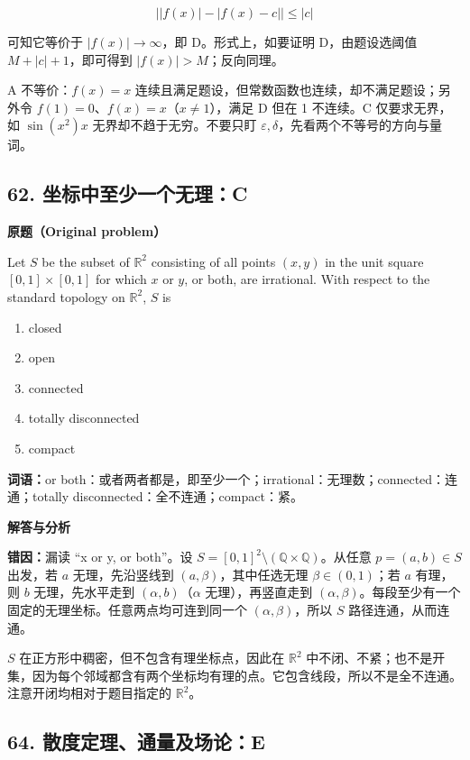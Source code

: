 \documentclass[11pt,a4paper]{ctexart}
\begin{document}
\[\bigl||f(x)|-|f(x)-c|\bigr|\le |c|\]

可知它等价于 \(|f(x)|\to\infty\)，即 D。形式上，如要证明 D，由题设选阈值
\(M+|c|+1\)，即可得到 \(|f(x)|>M\)；反向同理。

A 不等价：\(f(x)=x\)
连续且满足题设，但常数函数也连续，却不满足题设；另外令
\(f(1)=0\)、\(f(x)=x\)（\(x\ne1\)），满足 D 但在 1 不连续。C
仅要求无界，如 \(\sin(x^2)x\) 无界却不趋于无穷。不要只盯
\(\varepsilon,\delta\)，先看两个不等号的方向与量词。

\hypertarget{ux5750ux6807ux4e2dux81f3ux5c11ux4e00ux4e2aux65e0ux7406c}{%
\subsection{62.
坐标中至少一个无理：C}\label{ux5750ux6807ux4e2dux81f3ux5c11ux4e00ux4e2aux65e0ux7406c}}

\textbf{原题（Original problem）}\par
Let $S$ be the subset of $\mathbb R^2$ consisting of all points $(x,y)$ in the unit square $[0,1]\times[0,1]$ for which $x$ or $y$, or both, are irrational. With respect to the standard topology on $\mathbb R^2$, $S$ is
\begin{enumerate}[label=(\Alph*),nosep]
\item closed \item open \item connected \item totally disconnected \item compact
\end{enumerate}
\textbf{词语：}or both：或者两者都是，即至少一个；irrational：无理数；connected：连通；totally disconnected：全不连通；compact：紧。

\textbf{解答与分析}\par


\textbf{错因：}漏读 ``x or y, or both''。设
\(S=[0,1]^2\setminus(\mathbb Q\times\mathbb Q)\)。从任意
\(p=(a,b)\in S\) 出发，若 \(a\) 无理，先沿竖线到
\((a,\beta)\)，其中任选无理 \(\beta\in(0,1)\)；若 \(a\) 有理，则 \(b\)
无理，先水平走到 \((\alpha,b)\)（\(\alpha\) 无理），再竖直走到
\((\alpha,\beta)\)。每段至少有一个固定的无理坐标。任意两点均可连到同一个
\((\alpha,\beta)\)，所以 \(S\) 路径连通，从而连通。

\(S\) 在正方形中稠密，但不包含有理坐标点，因此在 \(\mathbb R^2\)
中不闭、不紧；也不是开集，因为每个邻域都含有两个坐标均有理的点。它包含线段，所以不是全不连通。注意开闭均相对于题目指定的
\(\mathbb R^2\)。

\hypertarget{ux6563ux5ea6ux5b9aux7406ux901aux91cfux53caux573aux8bbae}{%
\subsection{64.
散度定理、通量及场论：E}\label{ux6563ux5ea6ux5b9aux7406ux901aux91cfux53caux573aux8bbae}}
\end{document}
